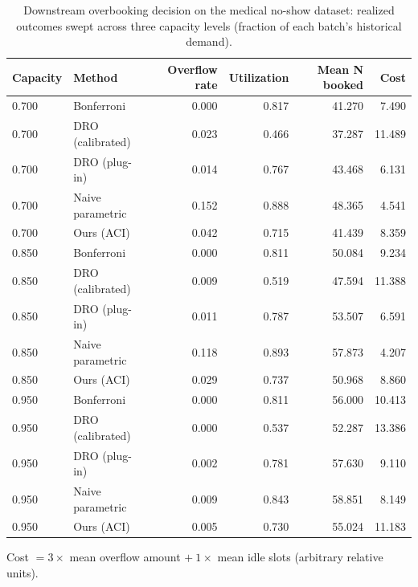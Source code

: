 \begin{table}[htbp]
\centering
\caption{Downstream overbooking decision on the medical no-show dataset: realized outcomes swept across three capacity levels (fraction of each batch's historical demand).}
\label{tab:decision-layer-real-data}
\begin{tabular}{llrrrr}
\toprule
Capacity & Method & Overflow rate & Utilization & Mean N booked & Cost \\
\midrule
0.700 & Bonferroni & 0.000 & 0.817 & 41.270 & 7.490 \\
0.700 & DRO (calibrated) & 0.023 & 0.466 & 37.287 & 11.489 \\
0.700 & DRO (plug-in) & 0.014 & 0.767 & 43.468 & 6.131 \\
0.700 & Naive parametric & 0.152 & 0.888 & 48.365 & 4.541 \\
0.700 & Ours (ACI) & 0.042 & 0.715 & 41.439 & 8.359 \\
0.850 & Bonferroni & 0.000 & 0.811 & 50.084 & 9.234 \\
0.850 & DRO (calibrated) & 0.009 & 0.519 & 47.594 & 11.388 \\
0.850 & DRO (plug-in) & 0.011 & 0.787 & 53.507 & 6.591 \\
0.850 & Naive parametric & 0.118 & 0.893 & 57.873 & 4.207 \\
0.850 & Ours (ACI) & 0.029 & 0.737 & 50.968 & 8.860 \\
0.950 & Bonferroni & 0.000 & 0.811 & 56.000 & 10.413 \\
0.950 & DRO (calibrated) & 0.000 & 0.537 & 52.287 & 13.386 \\
0.950 & DRO (plug-in) & 0.002 & 0.781 & 57.630 & 9.110 \\
0.950 & Naive parametric & 0.009 & 0.843 & 58.851 & 8.149 \\
0.950 & Ours (ACI) & 0.005 & 0.730 & 55.024 & 11.183 \\
\bottomrule
\end{tabular}
\begin{tablenotes}\small\item Cost $= 3\times$ mean overflow amount $+\ 1\times$ mean idle slots (arbitrary relative units).\end{tablenotes}
\end{table}
